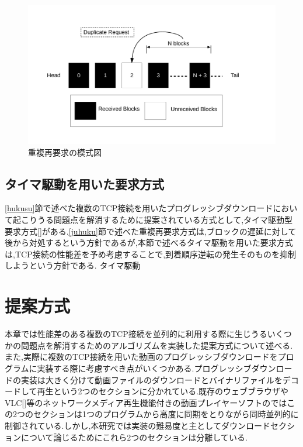 \documentclass[a4j,12pt]{gradthesis_utf8}
\begin{document}
 \begin{figure}[h]
     \centering
     \includegraphics[width=18cm]{block_dup.pdf}
     \caption{重複再要求の模式図}
     \label{blockdup}
 \end{figure}

\newpage
 
 
 \section{タイマ駆動を用いた要求方式}
 \ref{hukusu}節で述べた複数のTCP接続を用いたプログレッシブダウンロードにおいて起こりうる問題点を解消するために提案されている方式として,タイマ駆動型要求方式[]がある.\ref{juhuku}節で述べた重複再要求方式は,ブロックの遅延に対して後から対処するという方針であるが,本節で述べるタイマ駆動を用いた要求方式は,TCP接続の性能差を予め考慮することで,到着順序逆転の発生そのものを抑制しようという方針である.
 タイマ駆動
 
\chapter{提案方式}\label{sec:sec3}
本章では性能差のある複数のTCP接続を並列的に利用する際に生じうるいくつかの問題点を解消するためのアルゴリズムを実装した提案方式について述べる.\\
また,実際に複数のTCP接続を用いた動画のプログレッシブダウンロードをプログラムに実装する際に考慮すべき点がいくつかある.プログレッシブダウンロードの実装は大きく分けて動画ファイルのダウンロードとバイナリファイルをデコードして再生という2つのセクションに分かれている.既存のウェブブラウザやVLC[]等のネットワークメディア再生機能付きの動画プレイヤーソフトのではこの2つのセクションは1つのプログラムから高度に同期をとりながら同時並列的に制御されている.しかし,本研究では実装の難易度と主としてダウンロードセクションについて論じるためにこれら2つのセクションは分離している.
\end{document}
